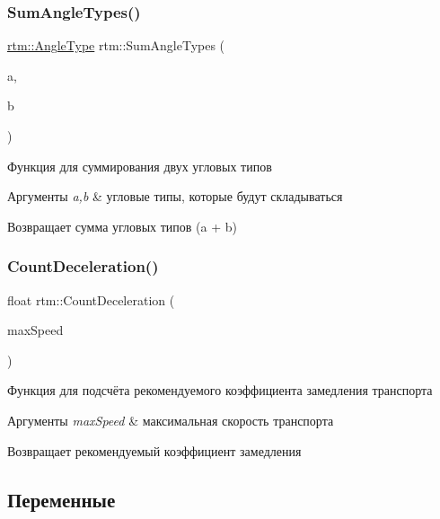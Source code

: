 \subsubsection{\texorpdfstring{Sum\+Angle\+Types()}{SumAngleTypes()}}
{\footnotesize\ttfamily \hyperlink{namespacertm_a69dc82b16a0148c10962caa83d930f89}{rtm\+::\+Angle\+Type} rtm\+::\+Sum\+Angle\+Types (\begin{DoxyParamCaption}\item[{\hyperlink{namespacertm_a69dc82b16a0148c10962caa83d930f89}{Angle\+Type}}]{a,  }\item[{\hyperlink{namespacertm_a69dc82b16a0148c10962caa83d930f89}{Angle\+Type}}]{b }\end{DoxyParamCaption})}

Функция для суммирования двух угловых типов 
\begin{DoxyParams}{Аргументы}
{\em a,b} & угловые типы, которые будут складываться \\
\hline
\end{DoxyParams}
\begin{DoxyReturn}{Возвращает}
сумма угловых типов (a + b) 
\end{DoxyReturn}
\mbox{\label{namespacertm_a37715773d85c66ba5c1bf11260836fd0}} 
\subsubsection{\texorpdfstring{Count\+Deceleration()}{CountDeceleration()}}
{\footnotesize\ttfamily float rtm\+::\+Count\+Deceleration (\begin{DoxyParamCaption}\item[{float}]{max\+Speed }\end{DoxyParamCaption})}

Функция для подсчёта рекомендуемого коэффициента замедления транспорта 
\begin{DoxyParams}{Аргументы}
{\em max\+Speed} & максимальная скорость транспорта \\
\hline
\end{DoxyParams}
\begin{DoxyReturn}{Возвращает}
рекомендуемый коэффициент замедления 
\end{DoxyReturn}


\subsection{Переменные}
\mbox{\label{namespacertm_ac6b72ea86e31b2b9ba35f29964ce0f5d}} 
